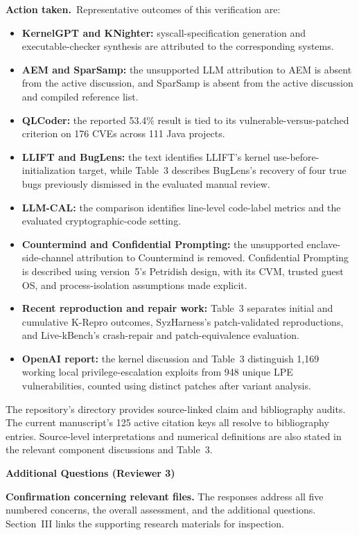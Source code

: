 \documentclass[11pt,a4paper]{article}
\newcommand{\action}{\par\textbf{Action taken.}\ }
\newcommand{\additional}[1]{\par\Needspace{5\baselineskip}\vspace{5pt}\textbf{Additional Questions (Reviewer #1)}\par}
\begin{document}
\action Representative outcomes of this verification are:
\begin{itemize}
\item \textbf{KernelGPT and KNighter:} syscall-specification generation and executable-checker synthesis are attributed to the corresponding systems.
\item \textbf{AEM and SparSamp:} the unsupported LLM attribution to AEM is absent from the active discussion, and SparSamp is absent from the active discussion and compiled reference list.
\item \textbf{QLCoder:} the reported 53.4\% result is tied to its vulnerable-versus-patched criterion on 176 CVEs across 111 Java projects.
\item \textbf{LLIFT and BugLens:} the text identifies LLIFT's kernel use-before-initialization target, while Table~3 describes BugLens's recovery of four true bugs previously dismissed in the evaluated manual review.
\item \textbf{LLM-CAL:} the comparison identifies line-level code-label metrics and the evaluated cryptographic-code setting.
\item \textbf{Countermind and Confidential Prompting:} the unsupported enclave-side-channel attribution to Countermind is removed. Confidential Prompting is described using version~5's Petridish design, with its CVM, trusted guest OS, and process-isolation assumptions made explicit.
\item \textbf{Recent reproduction and repair work:} Table~3 separates initial and cumulative K-Repro outcomes, SyzHarness's patch-validated reproductions, and Live-kBench's crash-repair and patch-equivalence evaluation.
\item \textbf{OpenAI report:} the kernel discussion and Table~3 distinguish 1,169 working local privilege-escalation exploits from 948 unique LPE vulnerabilities, counted using distinct patches after variant analysis.
\end{itemize}

The repository's  directory provides source-linked claim and bibliography audits. The current manuscript's 125 active citation keys all resolve to bibliography entries. Source-level interpretations and numerical definitions are also stated in the relevant component discussions and Table~3.

\additional{3}

\textbf{Confirmation concerning relevant files.} The responses address all five numbered concerns, the overall assessment, and the additional questions. Section~III links the supporting research materials for inspection.
\end{document}
